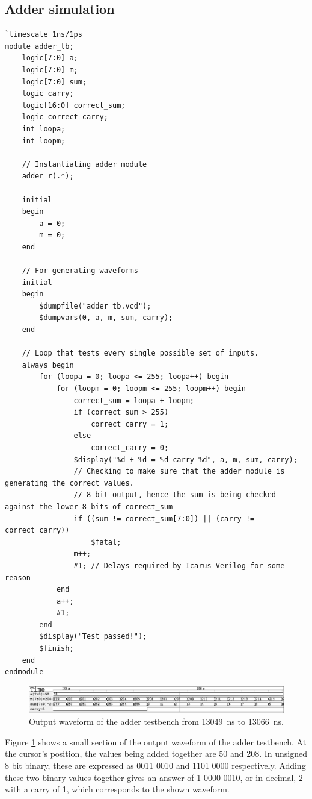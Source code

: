 \documentclass[a4paper,11pt]{article}
\begin{document}
\subsection{Adder simulation}
\begin{lstlisting}
`timescale 1ns/1ps
module adder_tb;
    logic[7:0] a;
    logic[7:0] m;
    logic[7:0] sum;
    logic carry;
    logic[16:0] correct_sum;
    logic correct_carry;
    int loopa;
    int loopm;
    
    // Instantiating adder module
    adder r(.*); 
    
    initial
    begin
        a = 0;
        m = 0;
    end
    
    // For generating waveforms
    initial
    begin
        $dumpfile("adder_tb.vcd");
        $dumpvars(0, a, m, sum, carry);
    end
    
    // Loop that tests every single possible set of inputs.
    always begin
        for (loopa = 0; loopa <= 255; loopa++) begin
            for (loopm = 0; loopm <= 255; loopm++) begin
                correct_sum = loopa + loopm;
                if (correct_sum > 255)
                    correct_carry = 1;
                else
                    correct_carry = 0;                    
                $display("%d + %d = %d carry %d", a, m, sum, carry);
                // Checking to make sure that the adder module is generating the correct values.
                // 8 bit output, hence the sum is being checked against the lower 8 bits of correct_sum
                if ((sum != correct_sum[7:0]) || (carry != correct_carry))
                    $fatal;
                m++;
                #1; // Delays required by Icarus Verilog for some reason
            end
            a++;
            #1;
        end        
        $display("Test passed!");
        $finish;
    end
endmodule
\end{lstlisting}

\begin{figure}
    \centering
        \includegraphics[scale=0.65]{../out/adder_tb.eps}
    \caption{Output waveform of the adder testbench from \SI{13049}{\nano\second} to \SI{13066}{\nano\second}.}
    \label{fig:addertbw}
\end{figure}

Figure \ref{fig:addertbw} shows a small section of the output waveform of the adder testbench. At the cursor's position, the values being added together are 50 and 208. In unsigned 8 bit binary, these are expressed as 0011 0010 and 1101 0000 respectively. Adding these two binary values together gives an answer of 1 0000 0010, or in decimal, 2 with a carry of 1, which corresponds to the shown waveform.
\end{document}
